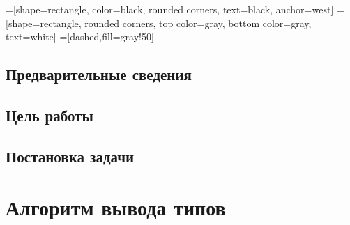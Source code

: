 


    =[shape=rectangle, color=black, rounded corners,%
    text=black, anchor=west]
    =[shape=rectangle, rounded corners,%
    top color=gray,%
    bottom color=gray, text=white]
    =[dashed,fill=gray!50]



\Intro
\section*{Предварительные сведения}
\section*{Цель работы}
\section*{Постановка задачи}


\chapter{Алгоритм вывода типов}
